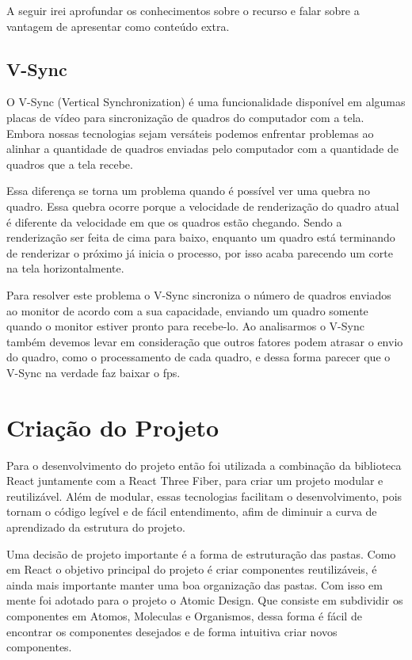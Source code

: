 \documentclass[tcc,capa]{texufpel}
\begin{document}
A seguir irei aprofundar os conhecimentos sobre o recurso e falar sobre a vantagem de apresentar como conteúdo extra.

\subsection{V-Sync}

O V-Sync (Vertical Synchronization) é uma funcionalidade disponível em algumas placas de vídeo para sincronização de quadros do computador com a tela. Embora nossas tecnologias sejam versáteis podemos enfrentar problemas ao alinhar a quantidade de quadros enviadas pelo computador com a quantidade de quadros que a tela recebe.

Essa diferença se torna um problema quando é possível ver uma quebra no quadro. Essa quebra ocorre porque a velocidade de renderização do quadro atual é diferente da velocidade em que os quadros estão chegando. Sendo a renderização ser feita de cima para baixo, enquanto um quadro está terminando de renderizar o próximo já inicia o processo, por isso acaba parecendo um corte na tela horizontalmente.

Para resolver este problema o V-Sync sincroniza o número de quadros enviados ao monitor de acordo com a sua capacidade, enviando um quadro somente quando o monitor estiver pronto para recebe-lo. Ao analisarmos o V-Sync também devemos levar em consideração que outros fatores podem atrasar o envio do quadro, como o processamento de cada quadro, e dessa forma parecer que o V-Sync na verdade faz baixar o fps. 


\section{Criação do Projeto}

Para o desenvolvimento do projeto então foi utilizada a combinação da biblioteca React juntamente com a React Three Fiber, para criar um projeto modular e reutilizável. Além de modular, essas tecnologias facilitam o desenvolvimento, pois tornam o código legível e de fácil entendimento, afim de diminuir a curva de aprendizado da estrutura do projeto.

Uma decisão de projeto importante é a forma de estruturação das pastas. Como em React o objetivo principal do projeto é criar componentes reutilizáveis, é ainda mais importante manter uma boa organização das pastas. Com isso em mente foi adotado para o projeto o Atomic Design. Que consiste em subdividir os componentes em Atomos, Moleculas e Organismos, dessa forma é fácil de encontrar os componentes desejados e de forma intuitiva criar novos componentes.
\end{document}
